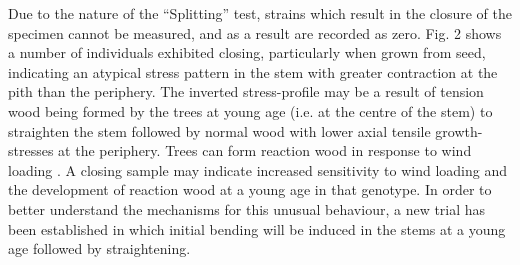 Due to the nature of the “Splitting” test, strains which result in the closure of the specimen cannot be measured, and as a result are recorded as zero. Fig. 2 shows a number of individuals exhibited closing, particularly when grown from seed, indicating an atypical stress pattern in the stem  \citep{Meinzer2011} with greater contraction at the pith than the periphery. The inverted stress-profile may be a result of tension wood being formed by the trees at young age (i.e. at the centre of the stem) to straighten the stem followed by normal wood with lower axial tensile growth-stresses at the periphery. Trees can form reaction wood in response to wind loading \citep{coutts1995wind}. A closing sample may indicate increased sensitivity to wind loading and the development of reaction wood at a young age in that genotype. In order to better understand the mechanisms for this unusual behaviour, a new trial has been established in which initial bending will be induced in the stems at a young age followed by straightening.
